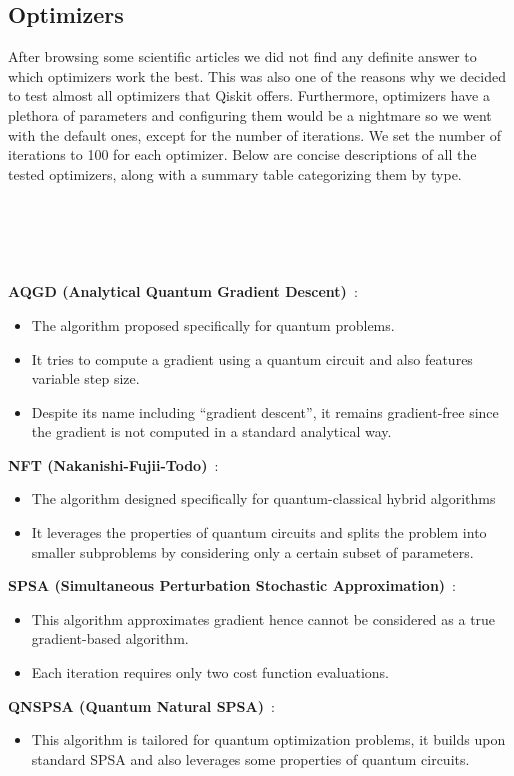 \subsection*{Optimizers}
After browsing some scientific articles we did not find any definite answer to which optimizers work the best. This was also one of the reasons why we decided to test almost all optimizers that Qiskit offers. Furthermore, optimizers have a plethora of parameters and configuring them would be a nightmare so we went with the default ones, except for the number of iterations. We set the number of iterations to 100 for each optimizer. Below are concise descriptions of all the tested optimizers, along with a summary table categorizing them by type.\\\\\\\\\\\\
\textbf{AQGD (Analytical Quantum Gradient Descent)}~\cite{aqgd}:
\begin{itemize}
    \item The algorithm proposed specifically for quantum problems.
    \item It tries to compute a gradient using a quantum circuit and also features variable step size.
    \item Despite its name including ``gradient descent'', it remains gradient-free since the gradient is not computed in a standard analytical way.
\end{itemize}
\textbf{NFT (Nakanishi-Fujii-Todo)}~\cite{nft}:
\begin{itemize}
    \item The algorithm designed specifically for quantum-classical hybrid algorithms
    \item It leverages the properties of quantum circuits and splits the problem into smaller subproblems by considering only a certain subset of parameters.
\end{itemize}
\textbf{SPSA (Simultaneous Perturbation Stochastic Approximation)}~\cite{spsa}:
\begin{itemize}
    \item This algorithm approximates gradient hence cannot be considered as a true gradient-based algorithm.
    \item Each iteration requires only two cost function evaluations.
\end{itemize}
\textbf{QNSPSA (Quantum Natural SPSA)}~\cite{qnspsa}:
\begin{itemize}
    \item This algorithm is tailored for quantum optimization problems, it builds upon standard SPSA and also leverages some properties of quantum circuits.
\end{itemize}
